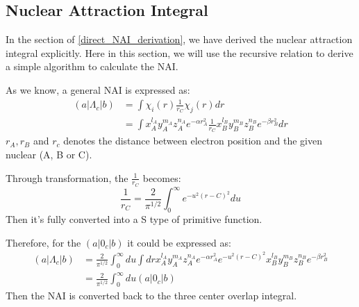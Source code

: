 \subsection{Nuclear Attraction Integral}
%
%
%
In the section of \ref{direct_NAI_derivation}, we have derived the nuclear
attraction integral explicitly. Here in this section, we will use the recursive
relation to derive a simple algorithm to calculate the NAI.

As we know, a general NAI is expressed as:
\begin{equation}
 \begin{split}
  (a|\Lambda_{c}|b) &= \int \chi_{i}(r)\frac{1}{r_{C}}\chi_{j}(r) dr \\
&= \int x^{l_{A}}_{A}y^{m_{A}}_{A}z^{n_{A}}_{A}e^{-\alpha r_{A}^{2}}
        \frac{1}{r_{C}}
        x^{l_{B}}_{B}y^{m_{B}}_{B}z^{n_{B}}_{B}e^{-\beta  r_{B}^{2}} dr
 \end{split}
\end{equation}
$r_{A}, r_{B}$ and $r_{c}$ denotes the distance between electron position and
the given nuclear (A, B or C).

Through transformation, the $\frac{1}{r_{C}}$ becomes:
\begin{equation}
\label{OS_nuclear_eq:1}
\frac{1}{r_{C}} = \frac{2}{\pi^{1/2}}\int^{\infty}_{0}e^{-u^{2}(r-C)^{2}} du
\end{equation}
Then it's fully converted into a S type of primitive function.

Therefore, for the $(a|0_{c}|b)$ it could be expressed as:
\begin{equation}
 \label{OS_nuclear_eq:2}
\begin{split}
(a|\Lambda_{c}|b) &= \frac{2}{\pi^{1/2}}\int^{\infty}_{0} du
 \int dr x^{l_{A}}_{A}y^{m_{A}}_{A}z^{n_{A}}_{A}e^{-\alpha r_{A}^{2}}
        e^{-u^{2}(r-C)^{2}}
        x^{l_{B}}_{B}y^{m_{B}}_{B}z^{n_{B}}_{B}e^{-\beta  r_{B}^{2}} \\
&= \frac{2}{\pi^{1/2}}\int^{\infty}_{0} du  (a|0_{c}|b)
\end{split}
\end{equation}
Then the NAI is converted back to the three center overlap integral.

